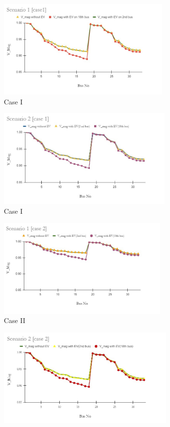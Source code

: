  		\begin{figure}[!h]
 			\begin{subfigure}{.5\textwidth}
 				\centering
 				\includegraphics[width=.97\linewidth,height= 4.95cm]{./Figures/sc1_case1}  
 				\caption{Case I}
 				\label{fig:LFa}
 			\end{subfigure}
 			\begin{subfigure}{.5\textwidth}
 				\centering
 				\includegraphics[width=.97\linewidth,height= 4.95cm]{./Figures/sc2_case1}  
 				\caption{Case I}
 				\label{fig:LF2a}
 			\end{subfigure}
 			\begin{subfigure}{.5\textwidth}
 				\centering
 				\includegraphics[width=.97\linewidth,height= 4.95cm]{./Figures/sc1_case2}
 				\caption{Case II}
 				\label{fig:LFb}
 			\end{subfigure}
 			\begin{subfigure}{.5\textwidth}
 				\centering
 				\includegraphics[width=.97\linewidth,height= 4.95cm]{./Figures/sc2_case2}

\end{subfigure}
\end{figure}
